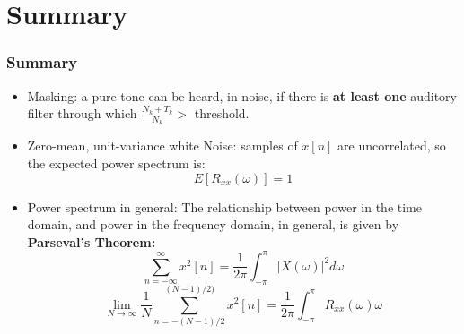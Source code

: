 \documentclass{beamer}
\begin{document}
\section[Summary]{Summary}
\setcounter{subsection}{1}

\begin{frame}
  \frametitle{Summary}
  \begin{itemize}
  \item Masking: a pure tone can be heard, in noise, if there is {\bf at least one}
    auditory filter through which $\frac{N_k+T_k}{N_k}>$ threshold.
  \item Zero-mean, unit-variance white Noise: samples of $x[n]$ are
    uncorrelated, so the expected power spectrum is:
    \begin{displaymath}
      E\left[R_{xx}(\omega)\right] = 1
    \end{displaymath}
  \item Power spectrum in general: The relationship between power in
    the time domain, and power in the frequency domain, in general, is
    given by {\bf Parseval's Theorem:}
    \begin{displaymath}
      \sum_{n=-\infty}^\infty x^2[n] = \frac{1}{2\pi}\int_{-\pi}^\pi |X(\omega)|^2d\omega
    \end{displaymath}
    \begin{displaymath}
      \lim_{N\rightarrow\infty}\frac{1}{N}\sum_{n=-(N-1)/2}^{(N-1)/2)} x^2[n] =
      \frac{1}{2\pi}\int_{-\pi}^\pi R_{xx}(\omega)\omega
    \end{displaymath}
  \end{itemize}
\end{frame}
\end{document}
